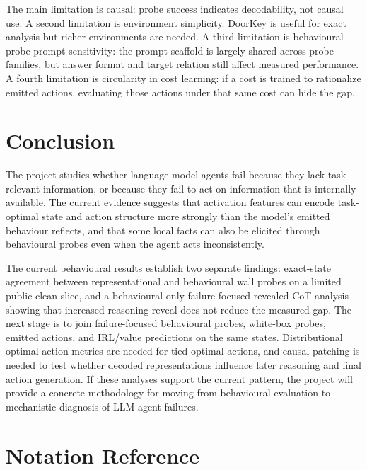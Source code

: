 \documentclass[11pt,a4paper]{article}
\begin{document}
The main limitation is causal: probe success indicates decodability, not causal use. A second limitation is environment simplicity. DoorKey is useful for exact analysis but richer environments are needed. A third limitation is behavioural-probe prompt sensitivity: the prompt scaffold is largely shared across probe families, but answer format and target relation still affect measured performance. A fourth limitation is circularity in cost learning: if a cost is trained to rationalize emitted actions, evaluating those actions under that same cost can hide the gap.

\section{Conclusion}

The project studies whether language-model agents fail because they lack task-relevant information, or because they fail to act on information that is internally available. The current evidence suggests that activation features can encode task-optimal state and action structure more strongly than the model's emitted behaviour reflects, and that some local facts can also be elicited through behavioural probes even when the agent acts inconsistently.

The current behavioural results establish two separate findings: exact-state agreement between representational and behavioural wall probes on a limited public clean slice, and a behavioural-only failure-focused revealed-CoT analysis showing that increased reasoning reveal does not reduce the measured gap. The next stage is to join failure-focused behavioural probes, white-box probes, emitted actions, and IRL/value predictions on the same states. Distributional optimal-action metrics are needed for tied optimal actions, and causal patching is needed to test whether decoded representations influence later reasoning and final action generation. If these analyses support the current pattern, the project will provide a concrete methodology for moving from behavioural evaluation to mechanistic diagnosis of LLM-agent failures.

\section{Notation Reference}
\end{document}
